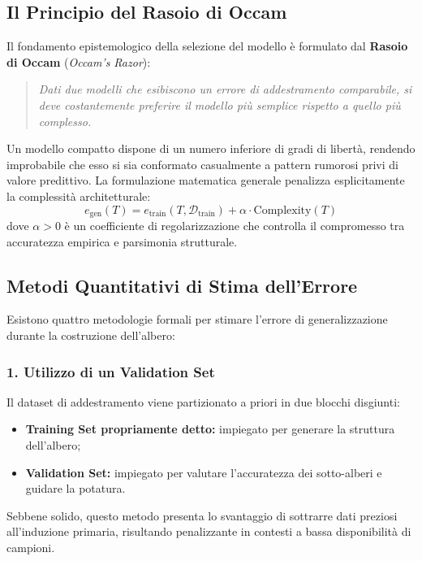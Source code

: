 \FloatBarrier
\subsection{Il Principio del Rasoio di Occam}
\label{subsec:dm-occams-razor}

Il fondamento epistemologico della selezione del modello è formulato dal \textbf{Rasoio di Occam} (\textit{Occam's Razor}):
\begin{quote}
\textit{Dati due modelli che esibiscono un errore di addestramento comparabile, si deve costantemente preferire il modello più semplice rispetto a quello più complesso.}
\end{quote}
Un modello compatto dispone di un numero inferiore di gradi di libertà, rendendo improbabile che esso si sia conformato casualmente a pattern rumorosi privi di valore predittivo.
La formulazione matematica generale penalizza esplicitamente la complessità architetturale:
\begin{equation}
    e_{\text{gen}}(T) = e_{\text{train}}(T, \mathcal{D}_{\text{train}}) + \alpha \cdot \text{Complexity}(T)
\end{equation}
dove $\alpha > 0$ è un coefficiente di regolarizzazione che controlla il compromesso tra accuratezza empirica e parsimonia strutturale.

\FloatBarrier
\subsection{Metodi Quantitativi di Stima dell'Errore}
\label{subsec:dm-generalization-estimators}

Esistono quattro metodologie formali per stimare l'errore di generalizzazione durante la costruzione dell'albero:

\subsubsection{1. Utilizzo di un Validation Set}
Il dataset di addestramento viene partizionato a priori in due blocchi disgiunti:
\begin{itemize}
    \item \textbf{Training Set propriamente detto:} impiegato per generare la struttura dell'albero;
    \item \textbf{Validation Set:} impiegato per valutare l'accuratezza dei sotto-alberi e guidare la potatura.
\end{itemize}
Sebbene solido, questo metodo presenta lo svantaggio di sottrarre dati preziosi all'induzione primaria, risultando penalizzante in contesti a bassa disponibilità di campioni.

